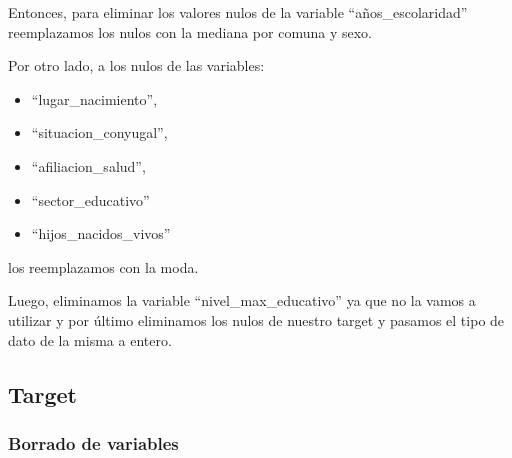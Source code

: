 \documentclass[a4paper]{article}
\begin{document}
        Entonces, para eliminar los valores nulos de la variable ``años\_escolaridad'' reemplazamos los nulos con la mediana por comuna y sexo.

        Por otro lado, a los nulos de las variables:
        \begin{itemize}
            \item ``lugar\_nacimiento'',
            \item ``situacion\_conyugal'',
            \item ``afiliacion\_salud'',
            \item ``sector\_educativo''
            \item ``hijos\_nacidos\_vivos''
        \end{itemize}
        los reemplazamos con la moda.
        
        Luego, eliminamos la variable ``nivel\_max\_educativo'' ya que no la vamos a utilizar y por último eliminamos los nulos de nuestro target y pasamos el tipo de dato de la misma a entero. 
        

    \subsection{Target}

        \subsubsection{Borrado de variables}
    
\end{document}
